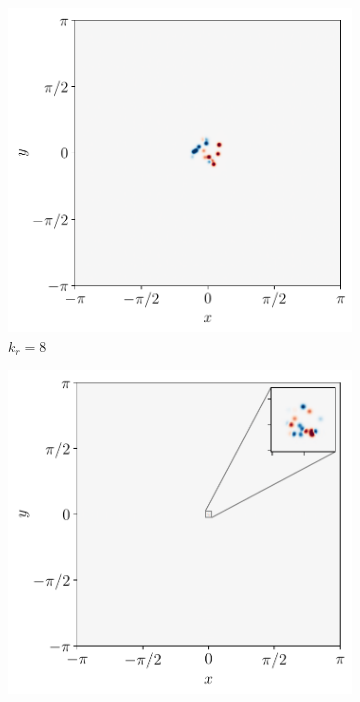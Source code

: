 \documentclass[../main.tex]{subfiles}
\begin{document}
\begin{figure}[ht]
	\centering
	\begin{subfigure}{0.44\textwidth}
		\centering
		\includegraphics[width=\textwidth]{images/forcing32_8.pdf}
		\caption{$k_r = 8$}
	\end{subfigure}\hspace{0.04\textwidth}
	\begin{subfigure}{0.44\textwidth}
		\centering
		\includegraphics[width=\textwidth]{images/forcing32_64.pdf}

\end{subfigure}
\end{figure}
\end{document}
